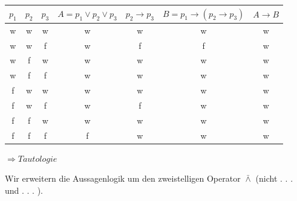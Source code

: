 \documentclass[10pt, a4paper]{exam}
\begin{document}
\begin{questions}
\begin{parts}
\begin{subparts}
\begin{solution}
                \begin{tabular}{c | c | c | c | c | c | c}
                    $p_1$ & $p_2$ & $p_3$ & $A=p_1\vee p_2\vee p_3$ & $p_2\rightarrow p_3$ & $B=p_1\rightarrow(p_2\rightarrow p_3)$ & $A\rightarrow B$ \\\hline
                    w     & w     & w     & w                       & w                    & w                                      & w                \\
                    w     & w     & f     & w                       & f                    & f                                      & w                \\
                    w     & f     & w     & w                       & w                    & w                                      & w                \\
                    w     & f     & f     & w                       & w                    & w                                      & w                \\
                    f     & w     & w     & w                       & w                    & w                                      & w                \\
                    f     & w     & f     & w                       & f                    & w                                      & w                \\
                    f     & f     & w     & w                       & w                    & w                                      & w                \\
                    f     & f     & f     & f                       & w                    & w                                      & w
                \end{tabular}

                $\Rightarrow Tautologie$
            \end{solution}
        \end{subparts}
    \end{parts}

    \question Wir erweitern die Aussagenlogik um den zweistelligen Operator $\bar{\wedge}$ (nicht . . . und . . . ).

\end{questions}
\end{document}
